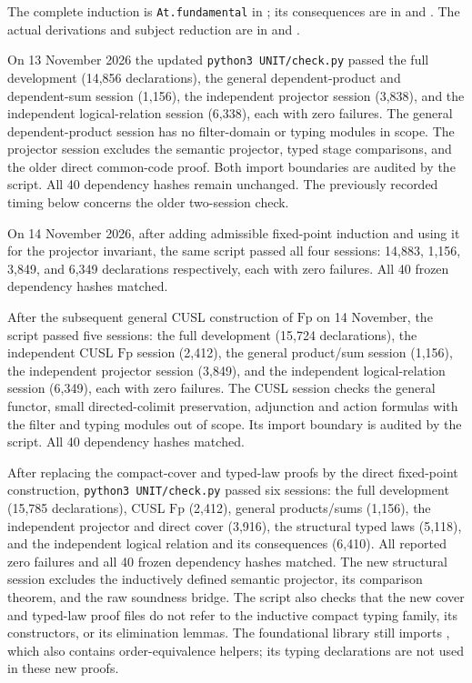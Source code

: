 \documentclass[11pt,a4paper]{article}
\theoremstyle{definition}
\theoremstyle{remark}
\begin{document}
The complete induction is \texttt{At.fundamental} in
; its consequences are in
 and .
The actual derivations and subject reduction are in
 and .

On 13 November 2026 the updated \texttt{python3 UNIT/check.py} passed
the full development (14,856 declarations), the general dependent-product
and dependent-sum session (1,156), the independent projector session (3,838),
and the independent logical-relation session (6,338), each with zero failures.
The general dependent-product session has no filter-domain or typing
modules in scope. The projector session excludes the semantic projector,
typed stage comparisons, and the older direct common-code proof. Both import boundaries are audited by the script.
All 40 dependency hashes remain unchanged. The previously recorded timing
below concerns the older two-session check.

On 14 November 2026, after adding admissible fixed-point induction and
using it for the projector invariant, the same script passed all four
sessions: 14,883, 1,156, 3,849, and 6,349 declarations respectively,
each with zero failures. All 40 frozen dependency hashes matched.

After the subsequent general CUSL construction of $\mathrm{Fp}$ on
14 November, the script passed five sessions: the full development
(15,724 declarations), the independent CUSL $\mathrm{Fp}$ session
(2,412), the general product/sum session (1,156), the independent
projector session (3,849), and the independent logical-relation session
(6,349), each with zero failures. The CUSL session checks the general
functor, small directed-colimit preservation, adjunction and action
formulas with the filter and typing modules out of scope. Its import
boundary is audited by the script. All 40 dependency hashes matched.

After replacing the compact-cover and typed-law proofs by the direct
fixed-point construction, \texttt{python3 UNIT/check.py} passed six sessions:
the full development (15,785 declarations), CUSL $\mathrm{Fp}$ (2,412),
general products/sums (1,156), the independent projector and direct cover
(3,916), the structural typed laws (5,118), and the independent logical
relation and its consequences (6,410). All reported zero failures and all
40 frozen dependency hashes matched. The new structural session excludes
the inductively defined semantic projector, its comparison theorem, and
the raw soundness bridge. The script also checks that the new cover and
typed-law proof files do not refer to the inductive compact typing family,
its constructors, or its elimination lemmas. The foundational library
still imports , which also contains order-equivalence
helpers; its typing declarations are not used in these new proofs.
\end{document}
